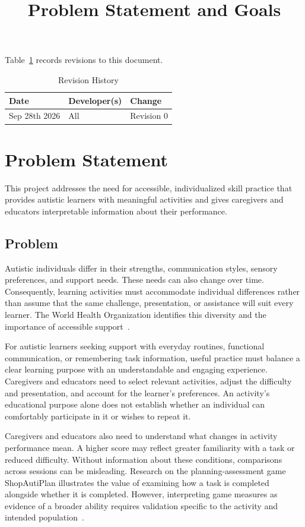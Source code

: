 \documentclass{article}
\title{Problem Statement and Goals\\\progname}
\author{\authname}
\date{}
\begin{document}
\maketitle

Table~\ref{TblRevisionHistory} records revisions to this document.

\begin{table}[hp]
\caption{Revision History} \label{TblRevisionHistory}
\begin{tabularx}{\textwidth}{llX}
\toprule
\textbf{Date} & \textbf{Developer(s)} & \textbf{Change}\\
\midrule
Sep 28th 2026 & All & Revision 0\\
\bottomrule
\end{tabularx}
\end{table}

\section{Problem Statement}

This project addresses the need for accessible, individualized skill practice
that provides autistic learners with meaningful activities and gives caregivers
and educators interpretable information about their performance.

\subsection{Problem}

Autistic individuals differ in their strengths, communication styles, sensory
preferences, and support needs. These needs can also change over time.
Consequently, learning activities must accommodate individual differences rather
than assume that the same challenge, presentation, or assistance will suit every
learner. The World Health Organization identifies this diversity and the
importance of accessible support~\citep{whoAutism}.

For autistic learners seeking support with everyday routines, functional
communication, or remembering task information, useful practice must balance a
clear learning purpose with an understandable and engaging experience.
Caregivers and educators need to select relevant activities, adjust the
difficulty and presentation, and account for the learner's preferences. An
activity's educational purpose alone does not establish whether an individual
can comfortably participate in it or wishes to repeat it.

Caregivers and educators also need to understand what changes in activity
performance mean. A higher score may reflect greater familiarity with a task
or reduced difficulty.
Without information about these conditions, comparisons across sessions can be
misleading. Research on the
planning-assessment game ShopAutiPlan illustrates the value of examining how a
task is completed alongside whether it is completed. However, interpreting game
measures as evidence of a broader ability requires validation specific to the
activity and intended population~\citep{shamhan2026}.
\end{document}
